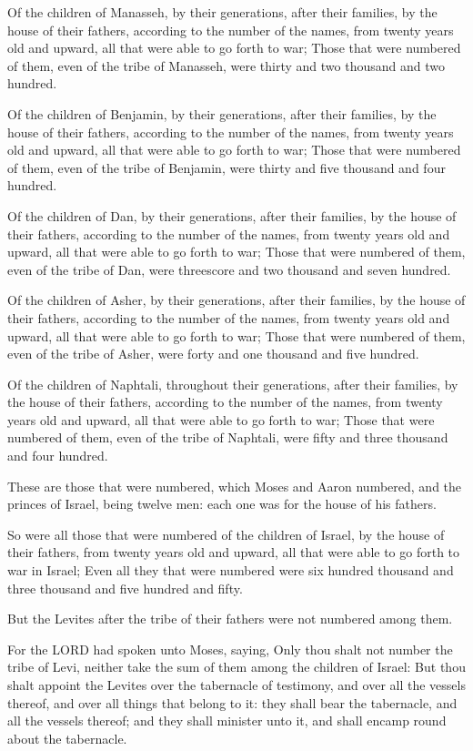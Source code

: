 \verse Of the children of Manasseh, by their generations, after their
families, by the house of their fathers, according to the number of
the names, from twenty years old and upward, all that were able to go
forth to war; \verse Those that were numbered of them, even of the tribe
of Manasseh, were thirty and two thousand and two hundred.

\verse Of the children of Benjamin, by their generations, after their
families, by the house of their fathers, according to the number of
the names, from twenty years old and upward, all that were able to go
forth to war; \verse Those that were numbered of them, even of the tribe
of Benjamin, were thirty and five thousand and four hundred.

\verse Of the children of Dan, by their generations, after their
families, by the house of their fathers, according to the number of
the names, from twenty years old and upward, all that were able to go
forth to war; \verse Those that were numbered of them, even of the tribe
of Dan, were threescore and two thousand and seven hundred.

\verse Of the children of Asher, by their generations, after their
families, by the house of their fathers, according to the number of
the names, from twenty years old and upward, all that were able to go
forth to war; \verse Those that were numbered of them, even of the tribe
of Asher, were forty and one thousand and five hundred.

\verse Of the children of Naphtali, throughout their generations, after
their families, by the house of their fathers, according to the number
of the names, from twenty years old and upward, all that were able to
go forth to war; \verse Those that were numbered of them, even of the
tribe of Naphtali, were fifty and three thousand and four hundred.

\verse These are those that were numbered, which Moses and Aaron
numbered, and the princes of Israel, being twelve men: each one was
for the house of his fathers.

\verse So were all those that were numbered of the children of Israel,
by the house of their fathers, from twenty years old and upward, all
that were able to go forth to war in Israel; \verse Even all they that
were numbered were six hundred thousand and three thousand and five
hundred and fifty.

\verse But the Levites after the tribe of their fathers were not
numbered among them.

\verse For the LORD had spoken unto Moses, saying, \verse Only thou shalt
not number the tribe of Levi, neither take the sum of them among the
children of Israel: \verse But thou shalt appoint the Levites over the
tabernacle of testimony, and over all the vessels thereof, and over
all things that belong to it: they shall bear the tabernacle, and all
the vessels thereof; and they shall minister unto it, and shall encamp
round about the tabernacle.

